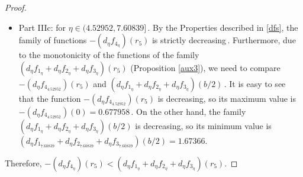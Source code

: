 \documentclass[final,11pt]{article}
\numberwithin{equation}{section}
\theoremstyle{definition}
\begin{document}
\begin{proof}
\begin{itemize}
\begin{itemize}
\item For $r_{5}\in(0,0.03]$\,. We compare $-\left(d_{\eta}f_{4_{\eta}}\right)(0)$ y $\left(d_{\eta}f_{1_{\eta}}+d_{\eta}f_{2_{\eta} }+d_{\eta}f_{3_{\eta}}\right)(0.3)$, which depend of $\eta$\,. Is easy to see that the maximum value of  $-\left(d_{\eta}f_{4_{\eta}}\right)(0)$ es $-\left(d_{\eta}f_{4_{1.82051}}\right)(0)=3.63409$, and the minimum value of $\left(d_{\eta}f_{1_{\eta}}+d_{\eta}f_{2_{\eta} }+d_{\eta}f_{3_{\eta}}\right)(0.3)$ is $\left(d_{\eta}f_{1_{0}}+d_{\eta}f_{2_{0} }+d_{\eta}f_{3_{0}}\right)(0.3)=3.69114$\,. Therefore, we have the inequality $-\left(d_{\eta}f_{4_{\eta}}\right)(r_{5})<\left(d_{\eta}f_{1_{\eta}}+d_{\eta}f_{2_{\eta} }+d_{\eta}f_{3_{\eta}}\right)(r_{5})$.
\item For $r_{5}\in(0.3,b/2]$\,. It is enough to compare $-\left(d_{\eta}f_{4_{\eta}}\right)(0.3)$ and $\left(d_{\eta}f_{1_{\eta}}+d_{\eta}f_{2_{\eta} }+d_{\eta}f_{3_{\eta}}\right )(b/2)$, which can be seen as functions that depend on $\eta$\,. It is easy to show that the function $-\left(d_{\eta}f_{4_{\eta}}\right)(0.3)$ is monotically decreasing, so its maximum value is $-\left(d_{\eta}f_{4_{1.64631}}\right )(0.3)=0.667847$\,. On the other hand, the function $\left(d_{\eta}f_{1_{\eta}}+d_{\eta}f_{2_{\eta} }+d_{\eta}f_{3_{\eta} }\right)(b/2)$ is monotonically increasing, so its minimum value is $\left(d_{\eta}f_{1_{1.64631}}+d_{\eta}f_{2_{1.64631} }+d_ {\eta}f_{3_{1.64631}}\right)(b/2)=1.60192.$
\end{itemize}
\item Part IIIc: for $\eta\in(4.52952, 7.60839]$\,. By  the Properties described in \ref{dfs}, the family of functions $-\left(d_{\eta}f_{4_{\eta}}\right)(r_{5})$ is strictly decreasing\,. Furthermore, due to the monotonicity of the functions of the family $\left(d_{\eta}f_{1_{\eta}}+d_{\eta}f_{2_{\eta} }+d_{\eta}f_{3_{\eta} }\right)(r_{5})$ (Proposition \ref{aux3}), we need to compare $-\left(d_{\eta}f_{4_{4.52952}}\right)(r_{5})$ and $\left(d_{\eta}f_{1_{\eta}}+d_{\eta}f_{2_{\eta} }+d_{\eta}f_{3_{\eta}}\right)( b/2)$\,. It is easy to see that the function $-\left(d_{\eta}f_{4_{4.52952}}\right)(r_{5})$ is decreasing, so its maximum value is $-\left(d_{\eta}f_{4_{4.52952}}\right)(0)=0.677958$\,. On the other hand, the family $\left(d_{\eta}f_{1_{\eta}}+d_{\eta}f_{2_{\eta}}+d_{\eta}f_{3_{\eta}}\right)(b/2)$ is decreasing, so its minimum value is $\left(d_{\eta}f_{1_{7.60839}}+d_{\eta}f_{2_{7.60839} }+d_{\eta}f_{3_{7.60839}}\right)(b/2)=1.67366.$
\end{itemize}

Therefore, $-\left(d_{\eta}f_{4_{\eta}}\right)(r_{5})<\left(d_{\eta}f_{1_{\eta}}+d_{\eta}f_{2_{\eta} }+d_{\eta}f_{3_{\eta}}\right)(r_{5})$.
\end{proof}
\end{document}
